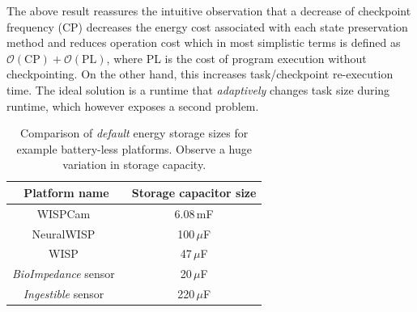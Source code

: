 The above result reassures the intuitive observation that a decrease of checkpoint frequency (CP) decreases the energy cost associated with each state preservation method and reduces operation cost which in most simplistic terms is defined as $\mathcal{O}(\text{CP})+\mathcal{O}(\text{PL})$, where PL is the cost of program execution without checkpointing. On the other hand, this increases task/checkpoint re-execution time. The ideal solution is a runtime that \emph{adaptively} changes task size during runtime, which however exposes a second problem.

\begin{table}
	\centering
	\footnotesize
	\begin{tabular}{|c|c|}
		\hline
		Platform name & Storage capacitor size \\
		\hline \hline
		WISPCam~\cite{naderiparizi_rfid_2015} & 6.08\,mF \\ %
		NeuralWISP~\cite{holleman_biocas_2008} & 100\,$\mu$F \\
		WISP~\cite{wisp5} & 47\,$\mu$F \\
		{\em BioImpedance} sensor~\cite{rodriguez_tbcs_2015} & 20\,$\mu$F \\
		{\em Ingestible} sensor~\cite{nadeau_naturebio_2017} & 220\,$\mu$F\\
		\hline
	\end{tabular} 
	\caption{Comparison of {\em default} energy storage sizes for example battery-less platforms. Observe a huge variation in storage capacity.}
	\label{table:capacitor}
\end{table}

